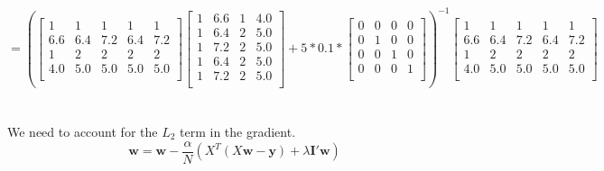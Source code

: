\documentclass[12pt]{article}
\begin{document}
\[
= \left(
\begin{bmatrix}
	1 & 1 & 1 & 1 & 1 \\
	6.6 & 6.4 & 7.2 & 6.4 & 7.2 \\
	1 & 2 & 2 & 2 & 2 \\
	4.0 & 5.0 & 5.0 & 5.0 & 5.0 \\
\end{bmatrix}
\begin{bmatrix}
	1 & 6.6 & 1 & 4.0 \\
	1 & 6.4 & 2 & 5.0 \\
	1 & 7.2 & 2 & 5.0 \\
	1 & 6.4 & 2 & 5.0 \\
	1 & 7.2 & 2 & 5.0 \\
\end{bmatrix}+5 * 0.1 * 
\begin{bmatrix}
	0 & 0 & 0 & 0 \\
	0 & 1 & 0 & 0 \\
	0 & 0 & 1 & 0 \\
	0 & 0 & 0 & 1 \\
\end{bmatrix}\right)^{-1}
\begin{bmatrix}
	1 & 1 & 1 & 1 & 1 \\
	6.6 & 6.4 & 7.2 & 6.4 & 7.2 \\
	1 & 2 & 2 & 2 & 2 \\
	4.0 & 5.0 & 5.0 & 5.0 & 5.0 \\
\end{bmatrix}
\]
\newpage

\section{}
We need to account for the $ L_2 $ term in the gradient.
\[ \textbf{w} = \textbf{w} - \dfrac{\alpha}{N}\left( X^T\left(X\textbf{w}-\textbf{y}\right) + \lambda \textbf{I}'\textbf{w} \right) \]
\end{document}
